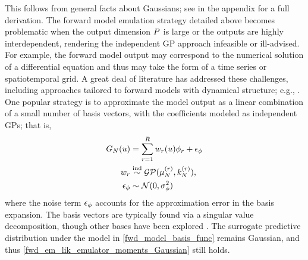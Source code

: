 \documentclass[12pt]{article}
\begin{document}
This follows from general facts about Gaussians; see  in the appendix for a full derivation.
The forward model emulation strategy detailed above becomes problematic when the output 
dimension $P$ is large or the outputs are highly interdependent, rendering the independent GP approach infeasible or ill-advised.
For example, the forward model output may correspond to the numerical solution of 
a differential equation and thus may take the form of a time series or spatiotemporal grid. 
A great deal of literature has addressed these challenges, including approaches tailored to forward models
with dynamical structure; e.g., \citet{GP_dynamic_emulation, Bayesian_emulation_dynamic, Liu_West_dynamic_emulation, dynamic_nonlinear_simulators_GP}.
One popular strategy is to approximate the model output as a linear combination of a small number of basis vectors, with the 
coefficients modeled as independent GPs; that is, 
\begin{align}
G_{N}(u) &= \sum_{r=1}^{R} w_{r}(u) \phi_{r} + \epsilon_{\phi} \label{fwd_model_basis_func} \\
w_{r} &\overset{\textrm{ind}}{\sim} \mathcal{GP}(\mu^{(r)}_{N}, k^{(r)}_{N}),  \\
 \epsilon_{\phi} &\sim \mathcal{N}(0, \sigma^2_{\phi})
\end{align}
where the noise term $\epsilon_{\phi}$ accounts for the approximation error in the basis expansion.
The basis vectors are typically found via a singular value decomposition, though other bases have been explored 
\citep{HigdonBasis, emulate_functional_output, functionValuedModels, PODemulation}. The surrogate predictive distribution
under the model in \cref{fwd_model_basis_func} remains Gaussian, 
and thus \cref{fwd_em_lik_emulator_moments_Gaussian} still holds.
\end{document}
